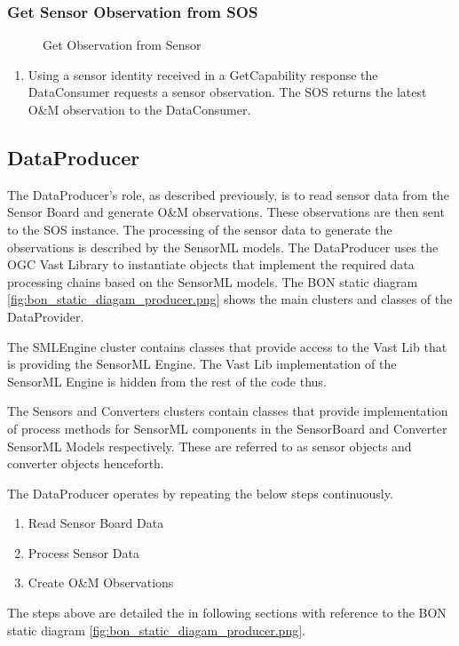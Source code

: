 \documentclass[]{final_report}
\begin{document}
\subsubsection{Get  Sensor Observation from SOS}
\begin{figure}[h]
\centering
{}
\caption{Get Observation from Sensor}\label{fig:GetObs}
\end{figure}
 \begin{enumerate}
\item Using a sensor identity received in a GetCapability response the DataConsumer requests a sensor observation. The SOS returns the latest O\&M observation to the DataConsumer.
\end{enumerate}




\newpage
\subsection{DataProducer}\label{DataProducerHigh}
The DataProducer's role, as described previously, is to read sensor data from the Sensor Board and generate O\&M observations. These observations are then sent to the SOS instance. The processing of the sensor data to generate the observations is described by the SensorML models. The DataProducer uses the OGC Vast Library to instantiate objects that implement the required data processing chains based on the SensorML models. The BON static diagram \ref{fig:bon_static_diagam_producer.png}
 shows the main clusters and classes of the DataProvider.

The SMLEngine cluster contains classes that provide access to
the Vast Lib that is providing the SensorML Engine.  The Vast Lib implementation
of the SensorML Engine is hidden from the rest of the code thus.

The Sensors and Converters clusters contain classes that provide
implementation of process methods for SensorML components in the SensorBoard and
Converter SensorML Models respectively. These are referred to as sensor objects and
converter objects henceforth.

The DataProducer operates by repeating the below steps continuously.
 \begin{enumerate}
\item Read Sensor Board Data
\item Process Sensor Data
\item Create O\&M Observations
\end{enumerate}
The steps above are detailed the in following sections with reference
to the BON static diagram \ref{fig:bon_static_diagam_producer.png}.
\end{document}
